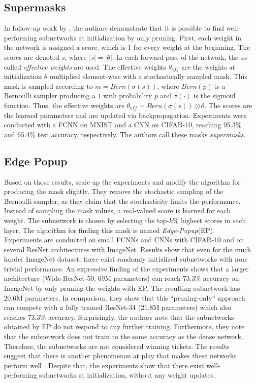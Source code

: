 \subsection{Supermasks}
In follow-up work by \textcite{DBLP:conf/nips/ZhouLLY19}, the authors demonstrate that it is possible to find well-performing subnetworks at initialization by only pruning.
First, each weight in the network is assigned a score, which is 1 for every weight at the beginning. 
The scores are denoted $s$, where $|s| = |\theta|$.
In each forward pass of the network, the so-called \textit{effective weights} are used.
The effective weights $\theta_{eff}$ are the weights at initialization $\theta$ multiplied element-wise with a stochastically sampled mask.
This mask is sampled according to $m = \textit{Bern}(\sigma(s))$, where $\textit{Bern}(p)$ is a Bernoulli sampler producing a $1$ with probability $p$ and $\sigma(\cdot)$ is the sigmoid function. 
Thus, the effective weights are $\theta_{eff} = \textit{Bern}(\sigma(s)) \odot \theta$.
The scores are the learned parameters and are updated via backpropagation.
Experiments were conducted with a FCNN on MNIST and a CNN on CIFAR-10, reaching 95.3\% and 65.4\% test accuracy, respectively.
The authors call these masks \textit{supermasks}.

\subsection{Edge Popup}
Based on those results, \textcite{DBLP:conf/cvpr/RamanujanWKFR20} scale up the experiments and modify the algorithm for producing the mask slightly.
They remove the stochastic sampling of the Bernoulli sampler, as they claim that the stochasticity limits the performance. 
Instead of sampling the mask values, a real-valued score is learned for each weight. 
The subnetwork is chosen by selecting the top-$k$\% highest scores in each layer.
The algorithm for finding this mask is named \textit{Edge-Popup}(EP).
Experiments are conducted on small FCNNs and CNNs with CIFAR-10 and on several ResNet architectures with ImageNet.
Results show that even for the much harder ImageNet dataset, there exist randomly initialized subnetworks with non-trivial performance. 
An expressive finding of the experiments shows that a larger architecture (Wide-ResNet-50, 69M parameters) can reach 73.3\% accuracy on ImageNet by only pruning the weights with EP.
The resulting subnetwork has 20.6M parameters. In comparison, they show that this “pruning-only” approach can compete with a fully trained ResNet-34 (21.8M parameters) which also reaches 73.3\% accuracy. 
Surprisingly, the authors note that the subnetworks obtained by EP do not respond to any further training.
Furthermore, they note that the subnetwork does not train to the same accuracy as the dense network.
Therefore, the subnetworks are not considered winning tickets.
The results suggest that there is another phenomenon at play that makes these networks perform well \autocite{DBLP:conf/cvpr/RamanujanWKFR20}.
Despite that, the experiments show that there exist well-performing subnetworks at initialization, without any weight updates.

